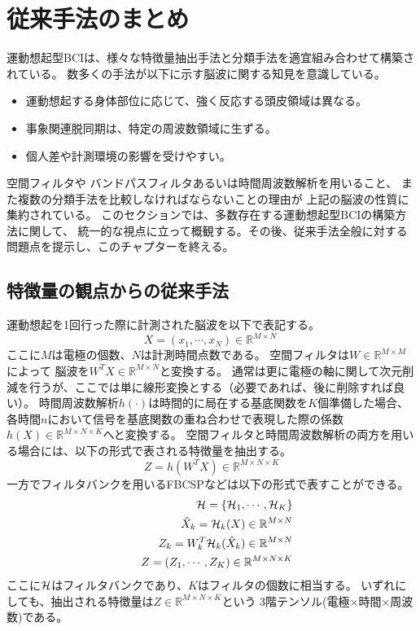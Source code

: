 \section{\mc 従来手法のまとめ}
運動想起型BCIは、様々な特徴量抽出手法と分類手法を適宜組み合わせて構築されている。
数多くの手法が以下に示す脳波に関する知見を意識している。
\begin{itemize}
    \item 運動想起する身体部位に応じて、強く反応する頭皮領域は異なる。
    \item 事象関連脱同期は、特定の周波数領域に生ずる。
    \item 個人差や計測環境の影響を受けやすい。
\end{itemize}
空間フィルタや
バンドパスフィルタあるいは時間周波数解析を用いること、
また複数の分類手法を比較しなければならないことの理由が
上記の脳波の性質に集約されている。
このセクションでは、多数存在する運動想起型BCIの構築方法に関して、
統一的な視点に立って概観する。その後、従来手法全般に対する問題点を提示し、このチャプターを終える。

\subsection{\mc 特徴量の観点からの従来手法}
運動想起を1回行った際に計測された脳波を以下で表記する。
\begin{equation}
    X =(x_1, \cdots, x_N)\in \mathbb{R}^{M \times N}\    
\end{equation}
ここに\(M\)は電極の個数、\(N\)は計測時間点数である。
空間フィルタは\(W\in \mathbb R^{M \times M}\)によって
脳波を\(W^TX \in \mathbb R^{M \times N}\)と変換する。
通常は更に電極の軸に関して次元削減を行うが、ここでは単に線形変換とする（必要であれば、後に削除すれば良い）。
時間周波数解析\(h(\cdot)\)は時間的に局在する基底関数を\(K\)個準備した場合、
各時間\(n\)において信号を基底関数の重ね合わせで表現した際の係数\(h(X) \in \mathbb R^{M \times N \times K}\)へと変換する。
空間フィルタと時間周波数解析の両方を用いる場合には、以下の形式で表される特徴量を抽出する。
\begin{equation}
    Z = h(W^TX) \in \mathbb R^{M\times N \times K}
    \label{eq:EEGfeatures}
\end{equation} 
一方でフィルタバンクを用いるFBCSPなどは以下の形式で表すことができる。
\begin{eqnarray}
    && {\cal H}  =  \{ {\cal H}_1,\cdots, {\cal H}_K \} \\
    && \hat X_k  = {\cal H}_k(X) \in \mathbb R^{M\times N} \\
    && Z_k  = W_k^T{\cal H}_k(\hat X_k) \in \mathbb R^{M\times N} \\
    && Z  =  (Z_1,\cdots, Z_K) \in \mathbb R^{M\times N \times K}
    \label{eq:EEGfeaturesbandpass}
\end{eqnarray} 
ここに\({\cal H}\)はフィルタバンクであり、\(K\)はフィルタの個数に相当する。
いずれにしても、抽出される特徴量は\(Z\in \mathbb R^{M\times N \times K}\)という
3階テンソル(電極×時間×周波数)である。

